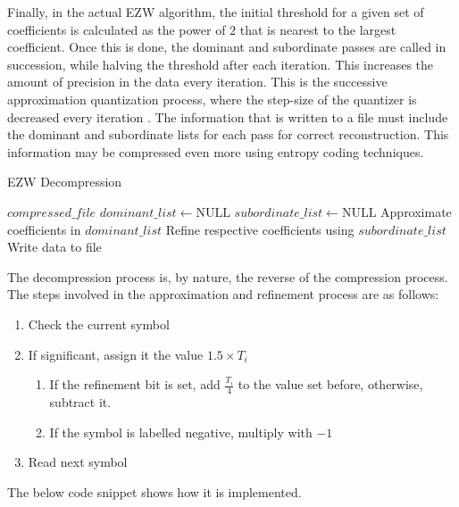 \documentclass[./A14_Report.tex]{subfiles}
\begin{document}
Finally, in the actual EZW algorithm, the initial threshold for a given set of
coefficients is calculated as the power of $2$ that is nearest to the largest
coefficient. Once this is done, the dominant and subordinate passes are called
in succession, while halving the threshold after each iteration. This increases
the amount of precision in the data every iteration. This is the successive
approximation quantization process, where the step-size of the quantizer is
decreased every iteration \cite{shap1993}. The information that is written to a
file must include the dominant and subordinate lists for each pass for correct
reconstruction. This information may be compressed even more using entropy
coding techniques.

\begin{algorithm}[H]
    \caption{EZW Decompression}
    \label{alg:ezwdecomp}
    \begin{algorithmic}
        \Require $compressed\_file$
        \State $dominant\_list \gets \text{NULL}$
        \State $subordinate\_list \gets \text{NULL}$
            \State Approximate coefficients in $dominant\_list$
            \State Refine respective coefficients using $subordinate\_list$
            \State Write data to file
        \EndFor
    \end{algorithmic}
\end{algorithm}

The decompression process is, by nature, the reverse of the compression
process. The steps involved in the approximation and refinement process are as
follows:
\begin{enumerate}
    \item{Check the current symbol}
    \item{If significant, assign it the value $1.5 \times T_i$}
        \begin{enumerate}
            \item{If the refinement bit is set, add $\frac{T_i}{4}$ to the
                value set before, otherwise, subtract it.}
            \item{If the symbol is labelled negative, multiply with $-1$}
        \end{enumerate}
    \item{Read next symbol}
\end{enumerate}

The below code snippet shows how it is implemented.
\end{document}
